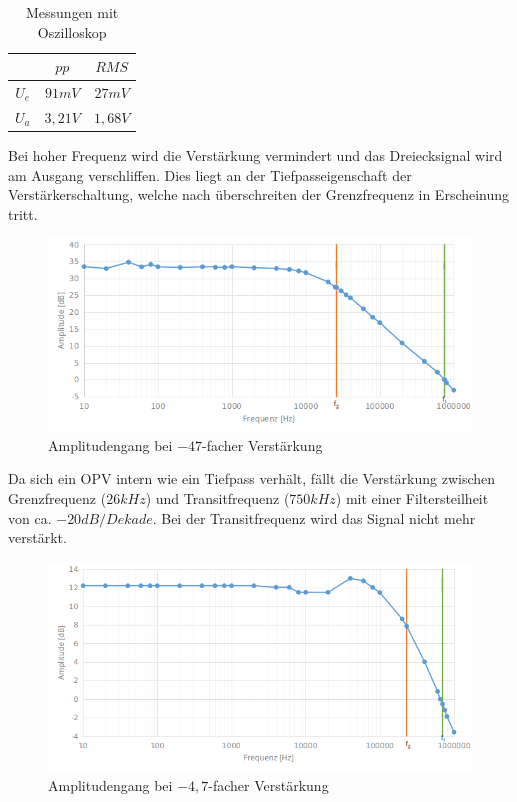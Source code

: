 \documentclass[12pt,a4paper,titlepage]{article}
\begin{document}
\begin{table}[H]
  \centering
  \begin{tabular}{c|c|c}
     & $pp$ & $RMS$ \\
     \hline
    $U_{e}$ & $91mV$ & $27mV$ \\
    \hline
    $U_{a}$ & $3,21V$ & $1,68V$
  \end{tabular}
  \caption{Messungen mit Oszilloskop}
\end{table}

\noindent Bei hoher Frequenz wird die Verstärkung vermindert und das Dreiecksignal wird am Ausgang verschliffen. Dies liegt an der Tiefpasseigenschaft der Verstärkerschaltung, welche nach überschreiten der Grenzfrequenz in Erscheinung tritt.

\begin{figure}[H]
  \centering
  \includegraphics[width=150mm]{bode_47.png}
  \caption{Amplitudengang bei $-47$-facher Verstärkung}
\end{figure}

\noindent Da sich ein OPV intern wie ein Tiefpass verhält, fällt die Verstärkung zwischen Grenzfrequenz ($26kHz$) und Transitfrequenz ($750kHz$) mit einer Filtersteilheit von ca. $-20dB/Dekade$. Bei der Transitfrequenz wird das Signal nicht mehr verstärkt.

\begin{figure}[H]
  \centering
  \includegraphics[width=150mm]{bode_4_7.png}
  \caption{Amplitudengang bei $-4,7$-facher Verstärkung}
\end{figure}
\end{document}
